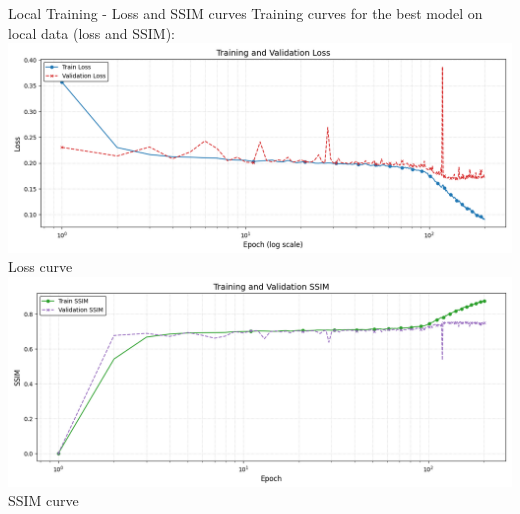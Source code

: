 \documentclass[footline=authortitle]{beamer}
\begin{document}
\begin{frame}[fragile]{Local Training - Loss and SSIM curves}
    Training curves for the best model on local data (loss and SSIM):
    \newline
    \includegraphics[width=0.7\linewidth]{images/local_loss_curve.png}
    \newline
    \small Loss curve 
    \newline
    \includegraphics[width=0.7\linewidth]{images/local_ssim_curve.png}
    \newline
    \small SSIM curve 
\end{frame}
\end{document}
